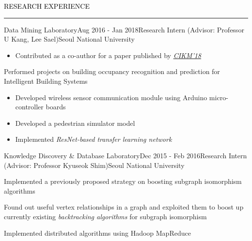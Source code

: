 \documentclass{resume} %
\renewenvironment{rSection}[1]{
	\sectionskip
	\textcolor{Black}{\MakeUppercase{#1}}
	\sectionlineskip
	\hrule
	\begin{list}{}{
			\setlength{\leftmargin}{1.5em}
		}
		\item[]
	}{
	\end{list}
}
\begin{document}
\begin{rSection}{Research Experience}
\begin{rSubsection}{Data Mining Laboratory}{Aug 2016 - Jan 2018}{Research Intern (Advisor: Professor U Kang, Lee Sael)}{Seoul National University}
\begin{itemize}
		\item Contributed as a co-author for a paper published by \href{https://www.cikm2018.units.it/}{\textit{CIKM'18}}
	\end{itemize}
	\item Performed projects on building occupancy recognition and prediction for Intelligent Building Systems
	\begin{itemize}
		\vspace*{-2.0mm}
		\item Developed wireless sensor communication module using Arduino micro-controller boards
		\vspace*{-2.0mm}
		\item Developed a pedestrian simulator model
		\vspace*{-2.0mm}
		\item Implemented \em{ResNet}\em-based transfer learning network
	\end{itemize}
\end{rSubsection}
\vspace*{-2.0mm}

\begin{rSubsection}{Knowledge Discovery \& Database Laboratory}{Dec 2015 - Feb 2016}{Research Intern (Advisor: Professor Kyuseok Shim)}{Seoul National University}
	\item Implemented a previously proposed strategy on boosting subgraph isomorphism algorithms
	\item Found out useful vertex relationships in a graph and exploited them to boost up currently existing \textit{backtracking algorithms} for subgraph isomorphism
	\item Implemented distributed algorithms using Hadoop MapReduce
\end{rSubsection}

\end{rSection}


\end{document}
